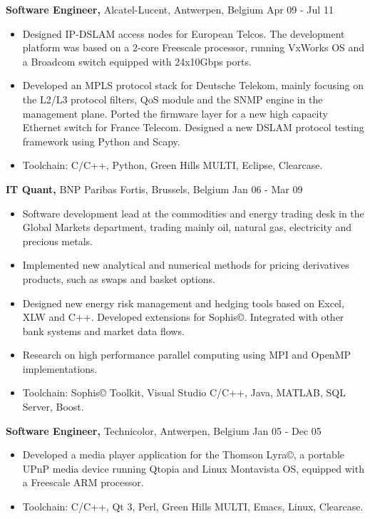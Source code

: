 \documentclass[margin]{res}
\begin{document}
\begin{resume}
{\bf Software Engineer,} Alcatel-Lucent, Antwerpen, Belgium \hfill  Apr 09 - Jul 11
\begin{itemize} \itemsep -2pt %
\item Designed IP-DSLAM access nodes for European Telcos. The development platform was based on a 2-core Freescale processor, running VxWorks OS and a Broadcom switch equipped with 24x10Gbps ports.
\item Developed an MPLS protocol stack for Deutsche Telekom, mainly focusing on the L2/L3 protocol filters, QoS module and the SNMP engine in the management plane. Ported the firmware layer for a new high capacity Ethernet switch for France Telecom. Designed a new DSLAM protocol testing framework using Python and Scapy.
\item Toolchain: C/C++, Python, Green Hills MULTI, Eclipse, Clearcase.
\end{itemize}

{\bf IT Quant,} BNP Paribas Fortis, Brussels, Belgium \hfill  Jan 06 - Mar 09
\begin{itemize} \itemsep -2pt %
\item Software development lead at the commodities and energy trading desk in the Global Markets department, trading mainly oil, natural gas, electricity and precious metals.
\item Implemented new analytical and numerical methods for pricing derivatives products, such as swaps and basket options.
\item Designed new energy risk management and hedging tools based on Excel, XLW and C++. Developed extensions for Sophis©. Integrated with other bank systems and market data flows.
\item Research on high performance parallel computing using MPI and OpenMP implementations.
\item Toolchain: Sophis© Toolkit, Visual Studio C/C++, Java, MATLAB, SQL Server, Boost.
\end{itemize}

{\bf Software Engineer,} Technicolor, Antwerpen, Belgium \hfill  Jan 05 - Dec 05
\begin{itemize} \itemsep -2pt %
\item Developed a media player application for the Thomson Lyra©, a portable UPnP media device running Qtopia and Linux Montavista OS, equipped with a Freescale ARM processor.
\item Toolchain: C/C++, Qt 3, Perl, Green Hills MULTI, Emacs, Linux, Clearcase.
\end{itemize}


\end{resume}
\end{document}
